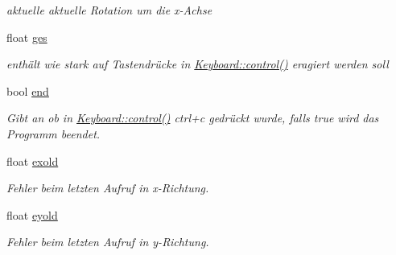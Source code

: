 \begin{DoxyCompactItemize}
\begin{DoxyCompactList}\small\item\em aktuelle aktuelle Rotation um die x-\/Achse \end{DoxyCompactList}\item 
float \hyperlink{class_cglobal_a478c0d94a8f8a7675d3e88e85742c81a}{ges}
\begin{DoxyCompactList}\small\item\em enthält wie stark auf Tastendrücke in \hyperlink{namespace_keyboard_abfb3168172d115a6516147c6d42f58db}{Keyboard::control()} eragiert werden soll \end{DoxyCompactList}\item 
bool \hyperlink{class_cglobal_a24fbb5c4b0ddab650375d08ba677b3f1}{end}
\begin{DoxyCompactList}\small\item\em Gibt an ob in \hyperlink{namespace_keyboard_abfb3168172d115a6516147c6d42f58db}{Keyboard::control()} ctrl+c gedrückt wurde, falls true wird das Programm beendet. \end{DoxyCompactList}\item 
float \hyperlink{class_cglobal_ae7af3539af53f18897359057206803d3}{exold}
\begin{DoxyCompactList}\small\item\em Fehler beim letzten Aufruf in x-\/Richtung. \end{DoxyCompactList}\item 
float \hyperlink{class_cglobal_a5ea9466dbc474b2f9b469395ae8d688c}{eyold}
\begin{DoxyCompactList}\small\item\em Fehler beim letzten Aufruf in y-\/Richtung. \end{DoxyCompactList}\end{DoxyCompactItemize}
